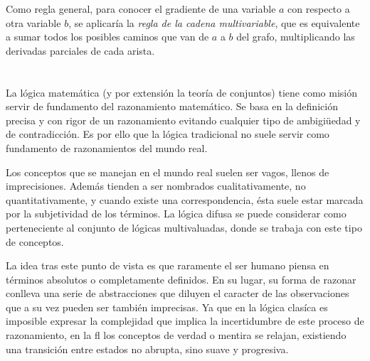 Como regla general, para conocer el gradiente de una variable $a$ con respecto a otra variable $b$, se aplicaría la \textit{regla de la cadena multivariable}, que es equivalente a sumar todos los posibles caminos que van de $a$ a $b$ del grafo, multiplicando las derivadas parciales de cada arista.

\section{}

La lógica matemática (y por extensión la teoría de conjuntos) tiene como misión servir de fundamento del razonamiento matemático. Se basa en la definición precisa y con rigor de un razonamiento evitando cualquier tipo de ambigiüedad y de contradicción. Es por ello que la lógica tradicional no suele servir como fundamento de razonamientos del mundo real.

Los conceptos que se manejan en el mundo real suelen ser vagos, llenos de imprecisiones. Además tienden a ser nombrados cualitativamente, no quantitativamente, y cuando existe una correspondencia, ésta suele estar marcada por la subjetividad de los términos. La lógica difusa se puede considerar como perteneciente al conjunto de lógicas multivaluadas, donde se trabaja con este tipo de conceptos.

La idea tras este punto de vista es que raramente el ser humano piensa en términos absolutos o completamente definidos. En su lugar, su forma de razonar conlleva una serie de abstracciones que diluyen el caracter de las observaciones que a su vez pueden ser también imprecisas. Ya que en la lógica clasíca es imposible expresar la complejidad que implica la incertidumbre de este proceso de razonamiento, en la \ac{fl} los conceptos de verdad o mentira se relajan, existiendo una transición entre estados no abrupta, sino suave y progresiva.

